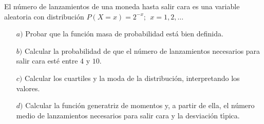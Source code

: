 \problem 

El n{\'u}mero de lanzamientos de una moneda hasta salir cara es  una variable aleatoria
con distribuci{\'o}n  $P(X = x)  =  2^{-x};\ \ x = 1, 2, \ldots$
\begin{enumerate}
	\item [$a)$] Probar que la funci{\'o}n masa de probabilidad est{\'a} bien definida.
	\item [$b)$] Calcular la probabilidad de que el n{\'u}mero de lanzamientos necesarios para salir cara est{\'e} entre $4$ y $10$.
	\item [$c)$] Calcular los cuartiles y la moda de la distribuci{\'o}n, interpretando los valores.
	\item [$d)$] Calcular la funci{\'o}n generatriz de momentos y, a partir de ella, el n{\'u}mero medio de lanzamientos necesarios para salir cara y la desviaci{\'o}n t{\'\i}pica.
\end{enumerate}

